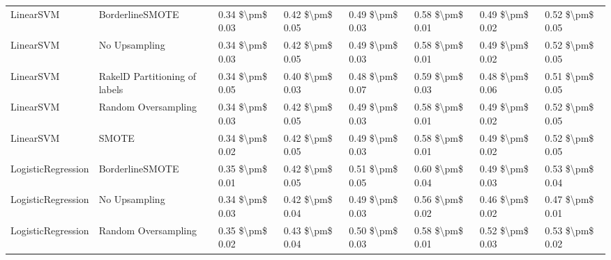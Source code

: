 \begin{tabular}{llllllll}
                      LinearSVM &               BorderlineSMOTE & 0.34 \$\textbackslash pm\$ 0.03 &           0.42 \$\textbackslash pm\$ 0.05 &       0.49 \$\textbackslash pm\$ 0.03 &        0.58 \$\textbackslash pm\$ 0.01 &                         0.49 \$\textbackslash pm\$ 0.02 &     0.52 \$\textbackslash pm\$ 0.05 \\
                      LinearSVM &                 No Upsampling & 0.34 \$\textbackslash pm\$ 0.03 &           0.42 \$\textbackslash pm\$ 0.05 &       0.49 \$\textbackslash pm\$ 0.03 &        0.58 \$\textbackslash pm\$ 0.01 &                         0.49 \$\textbackslash pm\$ 0.02 &     0.52 \$\textbackslash pm\$ 0.05 \\
                      LinearSVM & RakelD Partitioning of labels & 0.34 \$\textbackslash pm\$ 0.05 &           0.40 \$\textbackslash pm\$ 0.03 &       0.48 \$\textbackslash pm\$ 0.07 &        0.59 \$\textbackslash pm\$ 0.03 &                         0.48 \$\textbackslash pm\$ 0.06 &     0.51 \$\textbackslash pm\$ 0.05 \\
                      LinearSVM &           Random Oversampling & 0.34 \$\textbackslash pm\$ 0.03 &           0.42 \$\textbackslash pm\$ 0.05 &       0.49 \$\textbackslash pm\$ 0.03 &        0.58 \$\textbackslash pm\$ 0.01 &                         0.49 \$\textbackslash pm\$ 0.02 &     0.52 \$\textbackslash pm\$ 0.05 \\
                      LinearSVM &                         SMOTE & 0.34 \$\textbackslash pm\$ 0.02 &           0.42 \$\textbackslash pm\$ 0.05 &       0.49 \$\textbackslash pm\$ 0.03 &        0.58 \$\textbackslash pm\$ 0.01 &                         0.49 \$\textbackslash pm\$ 0.02 &     0.52 \$\textbackslash pm\$ 0.05 \\
             LogisticRegression &               BorderlineSMOTE & 0.35 \$\textbackslash pm\$ 0.01 &           0.42 \$\textbackslash pm\$ 0.05 &       0.51 \$\textbackslash pm\$ 0.05 &        0.60 \$\textbackslash pm\$ 0.04 &                         0.49 \$\textbackslash pm\$ 0.03 &     0.53 \$\textbackslash pm\$ 0.04 \\
             LogisticRegression &                 No Upsampling & 0.34 \$\textbackslash pm\$ 0.03 &           0.42 \$\textbackslash pm\$ 0.04 &       0.49 \$\textbackslash pm\$ 0.03 &        0.56 \$\textbackslash pm\$ 0.02 &                         0.46 \$\textbackslash pm\$ 0.02 &     0.47 \$\textbackslash pm\$ 0.01 \\
             LogisticRegression &           Random Oversampling & 0.35 \$\textbackslash pm\$ 0.02 &           0.43 \$\textbackslash pm\$ 0.04 &       0.50 \$\textbackslash pm\$ 0.03 &        0.58 \$\textbackslash pm\$ 0.01 &                         0.52 \$\textbackslash pm\$ 0.03 &     0.53 \$\textbackslash pm\$ 0.02 \\

\end{tabular}
